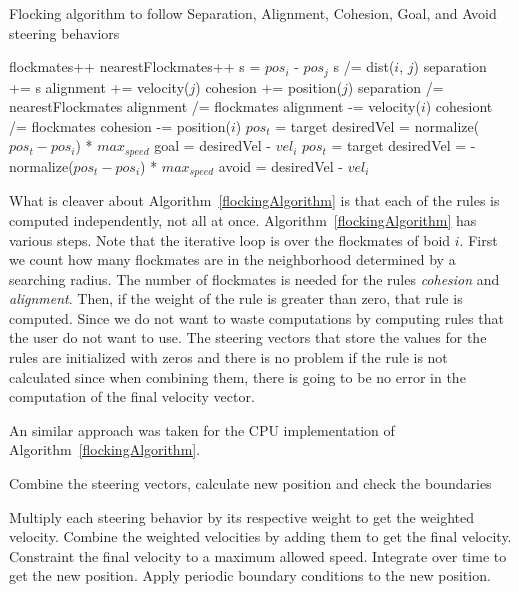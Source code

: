 \begin{algorithm}
\caption{Flocking algorithm to follow Separation, Alignment, Cohesion, Goal, and Avoid steering behaviors}
\label{flockingAlgorithm}
\begin{algorithmic}
	\STATE flockmates++
				\STATE nearestFlockmates++
				\STATE s = $pos_i$ - $pos_j$ 
				\STATE s /= dist($i$, $j$) 
				\STATE separation += s
			\ENDIF
		\ENDIF
			\STATE alignment += velocity($j$)
		\ENDIF
			\STATE cohesion += position($j$)
		\ENDIF
	\ENDIF
\ENDFOR
{}
	\STATE separation /= nearestFlockmates
\ENDIF
{}
	\STATE alignment /=  flockmates
	\STATE alignment -= velocity($i$)
\ENDIF
{}
	\STATE cohesiont /=  flockmates
	\STATE cohesion -= position($i$)
\ENDIF
{}
	\STATE $pos_t$ = target
	\STATE desiredVel = normalize($pos_t - pos_i$) * $max_{speed}$
	\STATE goal = desiredVel - $vel_i$
\ENDIF
{}
	\STATE $pos_t$ = target
	\STATE desiredVel = -normalize($pos_t - pos_i$) * $max_{speed}$
	\STATE avoid = desiredVel - $vel_i$
\ENDIF

\end{algorithmic}
\end{algorithm}

What is cleaver about Algorithm~\ref{flockingAlgorithm} is that each of the rules is computed independently, not all at once. Algorithm~\ref{flockingAlgorithm} has various steps. Note that the iterative loop is over the flockmates of boid $i$. First we count how many flockmates are in the neighborhood determined by a searching radius. The number of flockmates is needed for the rules \textit{cohesion} and \textit{alignment}. Then, if the weight of the rule is greater than zero, that rule is computed. Since we do not want to waste computations by computing rules that the user do not want to use. The steering vectors that store the values for the rules are initialized with zeros and there is no problem if the rule is not calculated since when combining them, there is going to be no error in the computation of the final velocity vector.

An similar approach was taken for the CPU implementation of Algorithm~\ref{flockingAlgorithm}.

\begin{algorithm}
\caption{Combine the steering vectors, calculate new position and check the boundaries}
\label{combineAlgorithm}
\begin{algorithmic}
\STATE Multiply each steering behavior by its respective weight to get the weighted velocity.
\STATE Combine the weighted velocities by adding them to get the final velocity.
\STATE Constraint the final velocity to a maximum allowed speed.
\STATE Integrate over time to get the new position.
\STATE Apply periodic boundary conditions to the new position.
\end{algorithmic}
\end{algorithm}

